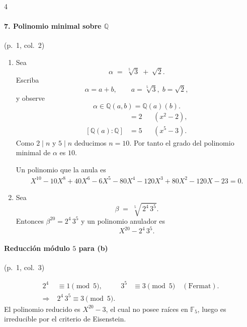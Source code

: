 \documentclass[landscape,a4paper]{article}
\begin{document}
\begin{multicols}{4}
\paragraph{7. Polinomio minimal sobre $\mathbb{Q}$}\hfill(p.~1, col.~2)

\begin{enumerate}
\item[\textbf{(a)}] Sea 
\[
\alpha \;=\; \sqrt[5]{3}\;+\;\sqrt{2}.
\]
Escriba
\[
\alpha = a + b, 
\qquad 
a = \sqrt[5]{3},\; b = \sqrt{2},
\]
y observe 
\[
\alpha \in \mathbb{Q}(a,b) = \mathbb{Q}(a)(b).
\tag*{(p.~1,\;col.~2)}
\]
\begin{align}
[\mathbb{Q}(b):\mathbb{Q}] &= 2 && (x^{2}-2),\\
[\mathbb{Q}(a):\mathbb{Q}] &= 5 && (x^{5}-3).
\end{align}
Como $2\mid n$ y $5\mid n$ deducimos $n=10$. Por tanto el grado del polinomio minimal de $\alpha$ es $10$.  

Un polinomio que la anula es
\begin{align}
X^{10}-10X^{8}+40X^{6}-6X^{5}-80X^{4}-120X^{3}+80X^{2}-120X-23=0.
\tag*{(p.~1,\;col.~2)}
\end{align}

\vspace{1em}
\item[\textbf{(b)}] Sea 
\[
\beta \;=\; \sqrt[5]{\,2^{4}\,3^{5}}.
\]
Entonces $\beta^{20}=2^{4}\,3^{5}$ y un polinomio anulador es 
\[
X^{20} - 2^{4}\,3^{5}.
\tag*{(p.~1,\;col.~2)}
\]

\end{enumerate}

\paragraph{Reducción módulo $5$ para (b)}\hfill(p.~1, col.~3)

\begin{align}
2^{4} &\equiv 1 \pmod{5}, &
3^{5} &\equiv 3 \pmod{5} \quad(\text{Fermat}).\\
\Rightarrow\;&2^{4}\,3^{5}\equiv 3 \pmod{5}.
\end{align}
El polinomio reducido es $X^{20}-3$, el cual no posee raíces en $\mathbb{F}_{5}$, luego es irreducible por el criterio de Eisenstein.  


\end{multicols}
\end{document}

